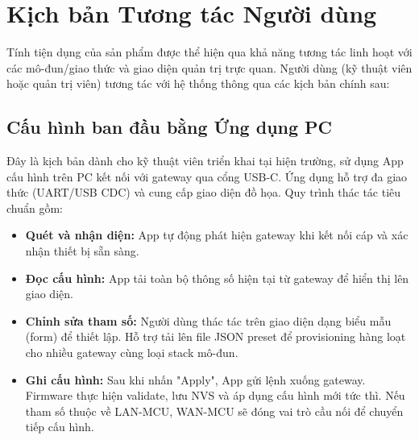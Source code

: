 \section{Kịch bản Tương tác Người dùng}

        
        
        


    Tính tiện dụng của sản phẩm được thể hiện qua khả năng tương tác linh hoạt với các mô-đun/giao thức và giao diện quản trị trực quan. Người dùng (kỹ thuật viên hoặc quản trị viên) tương tác với hệ thống thông qua các kịch bản chính sau:

    \subsection{Cấu hình ban đầu bằng Ứng dụng PC}
    Đây là kịch bản dành cho kỹ thuật viên triển khai tại hiện trường, sử dụng App cấu hình trên PC kết nối với gateway qua cổng USB-C. Ứng dụng hỗ trợ đa giao thức (UART/USB CDC) và cung cấp giao diện đồ họa. Quy trình thác tác tiêu chuẩn gồm:

    \begin{itemize}
        \item \textbf{Quét và nhận diện:} App tự động phát hiện gateway khi kết nối cáp và xác nhận thiết bị sẵn sàng.
        \item \textbf{Đọc cấu hình:} App tải toàn bộ thông số hiện tại từ gateway để hiển thị lên giao diện.
        \item \textbf{Chỉnh sửa tham số:} Người dùng thác tác trên giao diện dạng biểu mẫu (form) để thiết lập. Hỗ trợ tải lên file JSON preset để provisioning hàng loạt cho nhiều gateway cùng loại stack mô-đun.
        \item \textbf{Ghi cấu hình:} Sau khi nhấn "Apply", App gửi lệnh xuống gateway. Firmware thực hiện validate, lưu NVS và áp dụng cấu hình mới tức thì. Nếu tham số thuộc về LAN-MCU, WAN-MCU sẽ đóng vai trò cầu nối để chuyển tiếp cấu hình.
    \end{itemize}

